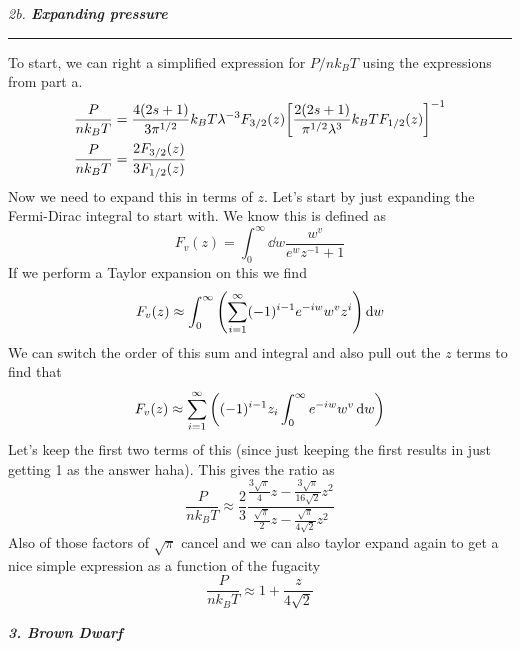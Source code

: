 \documentclass[12pt, letterpaper, twoside]{article}
\newcommand{\question}[1]{{\noindent \it #1}}
\newcommand{\answer}[1]{
    \par\noindent\rule{\textwidth}{0.4pt}#1\vspace{0.5cm}
}
\begin{document}
\question{2b. \textbf{Expanding pressure}}
\answer{
    To start, we can right a simplified expression for $P / n k_B T$ using the expressions from part a.
    \begin{align}
        \frac{P}{n k_B T} &= \frac{4(2s + 1)}{3 \pi^{1/2}} k_B T \lambda^{-3} F_{3/2}(z) \qty[\frac{2(2s + 1)}{\pi^{1/2} \lambda^3} k_B T F_{1/2}(z)]^{-1} \\
        \frac{P}{n k_B T} &= \frac{2 F_{3/2}(z)}{3 F_{1/2}(z)}
    \end{align}
    Now we need to expand this in terms of $z$. Let's start by just expanding the Fermi-Dirac integral to start with. We know this is defined as
    \begin{equation}
        F_v(z) = \int_0^\infty \dd{w} \frac{w^v}{e^w z^{-1} + 1}
    \end{equation}
    If we perform a Taylor expansion on this we find
    \begin{equation}
        F_v(z) \approx \int_0^\infty \qty(\sum_{i = 1}^{\infty} (-1)^{i - 1} e^{- i w} w^v z^i) \dd{w}
    \end{equation}
    We can switch the order of this sum and integral and also pull out the $z$ terms to find that
    \begin{equation}
        F_v(z) \approx \sum_{i = 1}^{\infty} \qty( (-1)^{i - 1} z_i \int_0^\infty e^{- i w} w^v \dd{w} )
    \end{equation}
    Let's keep the first two terms of this (since just keeping the first results in just getting 1 as the answer haha). This gives the ratio as
    \begin{equation}
        \frac{P}{n k_B T} \approx \frac{2}{3} \frac{\frac{3 \sqrt{\pi}}{4} z - \frac{3 \sqrt{\pi}}{16 \sqrt{2}} z^2}{\frac{\sqrt{\pi}}{2} z - \frac{\sqrt{\pi}}{4 \sqrt{2}} z^2}
    \end{equation}
    Also of those factors of $\sqrt{\pi}$ cancel and we can also taylor expand again to get a nice simple expression as a function of the fugacity
    \begin{equation}
        \boxed{ \frac{P}{n k_B T} \approx 1 + \frac{z}{4 \sqrt{2}} }
    \end{equation}
}

\question{\textbf{3. Brown Dwarf}}
\end{document}

